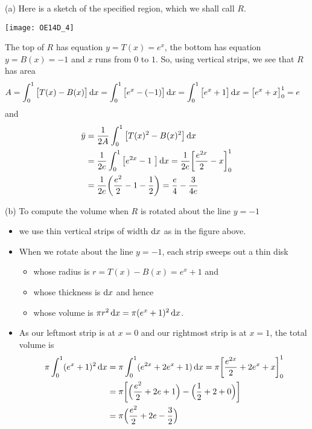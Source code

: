 \begin{solution} (a)
Here is a sketch of the specified region, which we shall call $R$.
\begin{center}
   \texttt{[image: OE14D\_4]}
\end{center}
The top of $R$ has equation $y=T(x)=e^x$, the bottom has equation
$y=B(x)=-1$ and $x$ runs from $0$ to $1$. So, using vertical strips,
we see that $R$ has area
\begin{align*}
A & = \int_0^1 \big[T(x)-B(x)\big]\,\mathrm{d}x
= \int_0^1 \big[e^x-(-1)\big]\,\mathrm{d}x
= \int_0^1 \big[e^x+1\big]\,\mathrm{d}x
= \big[e^x+x\big]_0^1
= e
\end{align*}
and
\begin{align*}
\bar y &=\frac{1}{2A} \int_0^1 \big[T(x)^2-B(x)^2\big]\,\mathrm{d}x  \\
 &= \frac{1}{2e}\int_0^1 \big[ e^{2x} - 1\ \big] \,\mathrm{d}x
 = \frac{1}{2e} \bigg[\frac{e^{2x}}{2} - x \bigg]_0^1 \\
  &=\frac{1}{2e} \bigg(\frac{e^2}{2} - 1 - \frac{1}{2} \bigg)
   = \frac{e}{4} - \frac{3}{4e}
\end{align*}

\noindent (b)
To compute the volume when $R$ is rotated about the line $y=-1$
\begin{itemize}
\item we use thin vertical strips of width $\mathrm{d}x$ as in the
figure above.

\item When we rotate about the line $y=-1$, each strip
sweeps out a thin disk
\begin{itemize}
\item
whose radius is $r=T(x)-B(x)=e^x+1$ and
\item
whose thickness is $\mathrm{d}x$ and hence
\item
whose volume is
$\pi r^2\,\mathrm{d}x
       = \pi(e^x+1)^2\,\mathrm{d}x$.

\end{itemize}
\item As our leftmost strip is at $x=0$ and our rightmost
strip is at $x=1$, the total volume is
\begin{align*}
\pi \int_0^1 (e^x+1)^2\,\mathrm{d}x
&=\pi \int_0^1 (e^{2x}+2e^x+1)\,\mathrm{d}x
=\pi\bigg[\frac{e^{2x}}{2}+2e^x + x\bigg]_0^1 \\
&=\pi\bigg[\Big(\frac{e^{2}}{2}+2e + 1\Big)
          -\Big(\frac{1}{2}+2 + 0\Big)\bigg] \\
&=\pi\Big(\frac{e^{2}}{2}+2e -\frac{3}{2}\Big)
\end{align*}
\end{itemize}

\end{solution}


